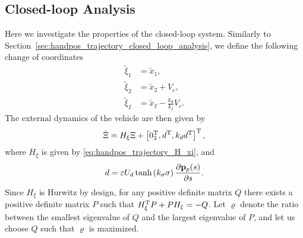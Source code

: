 \subsection{Closed-loop Analysis}
Here we investigate the properties of the closed-loop system.
Similarly to Section~\ref{sec:handpos_trajectory_closed_loop_analysis}, we define the following change of coordinates
\begin{subequations}
    \begin{align}
        \tilde{\xi}_1 &= \tilde{x}_1, \\
        \tilde{\xi}_2 &= \tilde{x}_2 + V_c, \\
        \tilde{\xi}_I &= \tilde{x}_I - \frac{k_d}{k_I}V_c.
    \end{align} \label{eq:handpos_trajectory_hand_transform_CL_path}
\end{subequations}
The external dynamics of the vehicle are then given by
\begin{equation}
    \dot{\Xi} = H_{\xi}\Xi + \left[0_3^{\mathrm{T}}, d^{\mathrm{T}}, k_d d^{\mathrm{T}}\right]^{\mathrm{T}}, \label{eq:handpos_trajectory_external_dynamics_path}
\end{equation}
where $H_{\xi}$ is given by \eqref{eq:handpos_trajectory_H_xi}, and
\begin{equation}
    d = \varepsilon U_d \tanh\left(k_{\sigma}\sigma\right) \frac{\partial \mathbf{p}_p(s)}{\partial s}. \label{eq:handpos_trajectory_external_perturbation}
\end{equation}
Since $H_{\xi}$ is Hurwitz by design, for any positive definite matrix $Q$ there exists a positive definite matrix $P$ such that $H_{\xi}^{\mathrm{T}} P + P H_{\xi} = -Q$.
Let $\varrho$ denote the ratio between the smallest eigenvalue of $Q$ and the largest eigenvalue of $P$, and let us choose $Q$ such that $\varrho$ is maximized.

